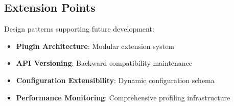 \documentclass{article}
\begin{document}
\subsection{Extension Points}

Design patterns supporting future development:

\begin{itemize}
\item \textbf{Plugin Architecture}: Modular extension system
\item \textbf{API Versioning}: Backward compatibility maintenance
\item \textbf{Configuration Extensibility}: Dynamic configuration schema
\item \textbf{Performance Monitoring}: Comprehensive profiling infrastructure
\end{itemize}
\end{document}

